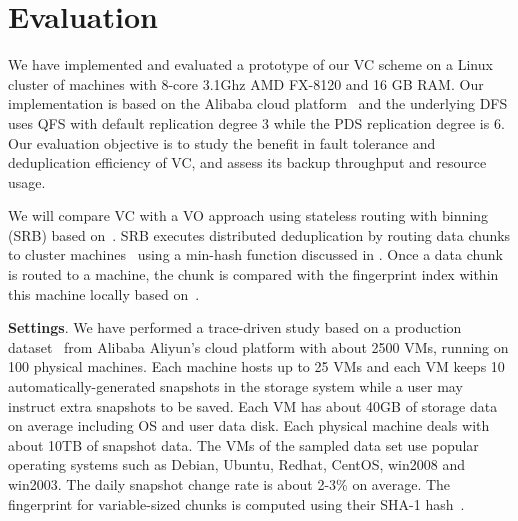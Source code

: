 \section{Evaluation}
\label{sect:evaluation}
We have implemented and evaluated a prototype of our VC scheme on a Linux cluster of machines with
8-core 3.1Ghz AMD FX-8120 and 16 GB RAM. 
Our implementation is based on the Alibaba cloud platform~\cite{Aliyun,WeiZhangIEEE}
and the underlying DFS uses  QFS with default replication degree 3 while the PDS replication degree is 6.
Our evaluation objective is to
study the benefit in fault tolerance and   deduplication efficiency of VC,  
and assess its backup throughput and  resource usage. 

We will compare VC with a VO approach  using stateless routing with binning (SRB) 
based on~\cite{Dong2011,extreme_binning09}.
SRB executes distributed deduplication by routing data chunks to cluster machines~\cite{Dong2011}
using  a min-hash function discussed in \cite{extreme_binning09}. Once a data chunk is routed to
a machine, the chunk is compared with the fingerprint index within this machine locally based 
on~\cite{extreme_binning09}.

{\bf Settings}.
We have performed a trace-driven study based on a production dataset~\cite{WeiZhangIEEE} from 
Alibaba Aliyun's cloud platform with about 2500 VMs, running on 100 physical machines. 
Each machine hosts up to 25 VMs and each VM keeps 10 automatically-generated snapshots in the storage 
system while a user may instruct extra snapshots to be saved.
Each VM has about 40GB of storage  data  on average
including OS and user data disk.
Each physical machine deals with about 10TB of snapshot data.
The VMs of the sampled data set use popular operating systems such as 
Debian, Ubuntu, Redhat, CentOS, win2008 and win2003. 
The daily snapshot change rate is about 2-3\% on average.
The fingerprint for variable-sized chunks is computed using their SHA-1 hash~\cite{similar94,rabin81}. 

